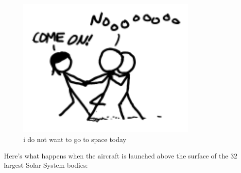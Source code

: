 \begin{figure}[!htbp]
\centering
\includegraphics[scale=0.5, max width=0.8\textwidth]{imgs/a/30/cessna_pilot.png}
\caption{i do not want to go to space today}
\end{figure}

{Here’s what happens when the aircraft is launched above the surface of the 32 largest Solar System bodies:}

